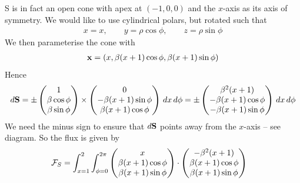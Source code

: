 \documentclass{../../template/note}
\begin{document}
\begin{example*}[hard]
        S is in fact an open cone with apex at \((-1, 0, 0)\) and the \(x\)-axis as its axis of symmetry. We would like to use cylindrical polars, but rotated such that
        \begin{align*}
            x = x, \qquad y = \rho \cos \phi, \qquad z = \rho \sin \phi
        \end{align*}
        We then parameterise the cone with
        \begin{align*}
            \V x = (x, \beta(x+1) \cos \phi, \beta(x+1) \sin \phi)
        \end{align*}
        Hence
        \begin{align*}
            d \V S = \pm \begin{pmatrix}
             1 \\
             \beta \cos \phi \\
             \beta \sin \phi \\
            \end{pmatrix} \times \begin{pmatrix}
             0 \\
             -\beta(x+1)\sin\phi \\
             \beta(x+1)\cos\phi \\
            \end{pmatrix} \D x \D \phi = \pm \begin{pmatrix}
             \beta^2(x+1) \\
             -\beta(x+1)\cos\phi \\
             -\beta(x+1)\sin\phi \\
            \end{pmatrix} \D x \D \phi
        \end{align*}
        We need the minus sign to ensure that \(d\V S\) points away from the \(x\)-axis -- see diagram. So the flux is given by
        \begin{align*}
            \mathcal{F}_S &= \int_{x=1}^2 \int_{\phi=0}^{2\pi} \begin{pmatrix}
             x \\
             \beta(x+1)\cos\phi \\
             \beta(x+1)\sin\phi \\
            \end{pmatrix} \cdot \begin{pmatrix}
             -\beta^2(x+1) \\
             \beta(x+1)\cos\phi \\
             \beta(x+1)\sin\phi \\

\end{pmatrix}
\end{align*}
\end{example*}
\end{document}
